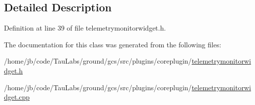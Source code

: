 \subsection{\-Detailed \-Description}


\-Definition at line 39 of file telemetrymonitorwidget.\-h.



\-The documentation for this class was generated from the following files\-:\begin{DoxyCompactItemize}
\item 
/home/jb/code/\-Tau\-Labs/ground/gcs/src/plugins/coreplugin/\hyperlink{telemetrymonitorwidget_8h}{telemetrymonitorwidget.\-h}\item 
/home/jb/code/\-Tau\-Labs/ground/gcs/src/plugins/coreplugin/\hyperlink{telemetrymonitorwidget_8cpp}{telemetrymonitorwidget.\-cpp}\end{DoxyCompactItemize}
